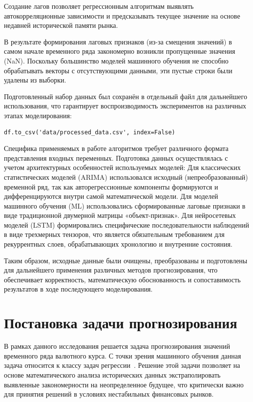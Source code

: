 Создание лагов позволяет регрессионным алгоритмам выявлять автокорреляционные зависимости и предсказывать текущее значение на основе недавней исторической памяти рынка.

В результате формирования лаговых признаков (из-за смещения значений) в самом начале временного ряда закономерно возникли пропущенные значения (NaN). Поскольку большинство моделей машинного обучения не способно обрабатывать векторы с отсутствующими данными, эти пустые строки были удалены из выборки.

Подготовленный набор данных был сохранён в отдельный файл для дальнейшего использования, что гарантирует воспроизводимость экспериментов на различных этапах моделирования:
\begin{lstlisting}
df.to_csv('data/processed_data.csv', index=False)
\end{lstlisting}

Специфика применяемых в работе алгоритмов требует различного формата представления входных переменных. Подготовка данных осуществлялась с учетом архитектурных особенностей используемых моделей:
Для классических статистических моделей (ARIMA) использовался исходный (непреобразованный) временной ряд, так как авторегрессионные компоненты формируются и дифференцируются внутри самой математической модели.
Для моделей машинного обучения (ML) использовались сформированные лаговые признаки в виде традиционной двумерной матрицы «объект-признак».
Для нейросетевых моделей (LSTM) формировались специфические последовательности наблюдений в виде трехмерных тензоров, что является обязательным требованием для рекуррентных слоев, обрабатывающих хронологию и внутренние состояния.

Таким образом, исходные данные были очищены, преобразованы и подготовлены для дальнейшего применения различных методов прогнозирования, что обеспечивает корректность, математическую обоснованность и сопоставимость результатов в ходе последующего моделирования.

\section{Постановка задачи прогнозирования}
В рамках данного исследования решается задача прогнозирования значений временного ряда валютного курса. С точки зрения машинного обучения данная задача относится к классу задач регрессии~\cite{magnus2004, dougherty2011}. Решение этой задачи позволяет на основе математического анализа исторических данных экстраполировать выявленные закономерности на неопределенное будущее, что критически важно для принятия решений в условиях нестабильных финансовых рынков.


